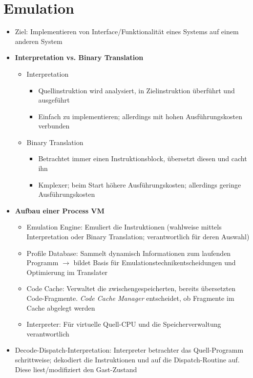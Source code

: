 \section{Emulation}
\begin{itemize}
	\item Ziel: Implementieren von Interface/Funktionalität eines Systems auf einem anderen System
	\item \textbf{Interpretation vs. Binary Translation}
	\begin{itemize}
		\item Interpretation
		\begin{itemize}
			\item Quellinstruktion wird analysiert, in Zielinstruktion überführt und ausgeführt
			\item Einfach zu implementieren; allerdings mit hohen Ausführungskosten verbunden
		\end{itemize}
		\item Binary Translation
		\begin{itemize}
			\item Betrachtet immer einen Instruktionsblock, übersetzt diesen und cacht ihn
			\item Kmplexer; beim Start höhere Ausführungskosten; allerdings geringe Ausführungskosten
		\end{itemize}
	\end{itemize}
	\item \textbf{Aufbau einer Process VM}
	\begin{itemize}
		\item Emulation Engine: Emuliert die Instruktionen (wahlweise mittels Interpretation oder Binary Translation; verantwortlich für deren Auswahl)
		\item Profile Database: Sammelt dynamisch Informationen zum laufenden Programm \(\rightarrow\) bildet Basis für Emulationstechnikentscheidungen und Optimierung im Translater
		\item Code Cache: Verwaltet die zwischengespeicherten, bereits übersetzten Code-Fragmente. \textit{Code Cache Manager} entscheidet, ob Fragmente im Cache abgelegt werden
		\item Interpreter: Für virtuelle Quell-CPU und die Speicherverwaltung verantwortlich
	\end{itemize}
	\item Decode-Dispatch-Interpretation: Interpreter betrachter das Quell-Programm schrittweise; dekodiert die Instruktionen und auf die Dispatch-Routine auf. Diese liest/modifiziert den Gast-Zustand

\end{itemize}
